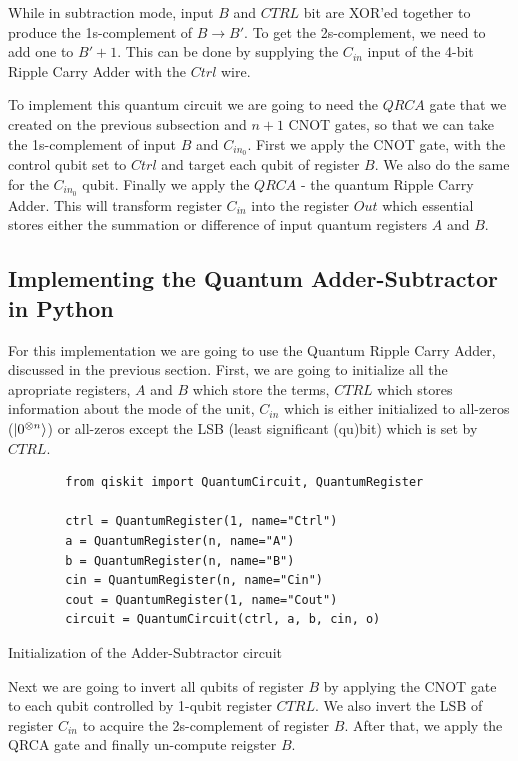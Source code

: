 While in subtraction mode, input $B$ and $CTRL$ bit are XOR'ed together to produce the 1s-complement of $B \rightarrow B'$.
To get the 2s-complement, we need to add one to $B' + 1$. This can be done by supplying the $C_{in}$ input of the
4-bit Ripple Carry Adder with the $Ctrl$ wire.

To implement this quantum circuit we are going to need the $QRCA$ gate that we created on the previous subsection and
$n+1$ CNOT gates, so that we can take the 1s-complement of input $B$ and $C_{in_{0}}$. First we apply the CNOT gate, with
the control qubit set to $Ctrl$ and target each qubit of register $B$. We also do the same for the $C_{in_{0}}$ qubit.
Finally we apply the $QRCA$ - the quantum Ripple Carry Adder. This will transform register $C_{in}$ into the register $Out$
which essential stores either the summation or difference of input quantum registers $A$ and $B$.

\subsection{Implementing the Quantum Adder-Subtractor in Python}

For this implementation we are going to use the Quantum Ripple Carry Adder, discussed in the previous section.
First, we are going to initialize all the apropriate registers, $A$ and $B$ which store the terms, $CTRL$ which
stores information about the mode of the unit, $C_{in}$ which is either initialized to all-zeros ($\ket{0^{\otimes n}}$)
or all-zeros except the LSB (least significant (qu)bit) which is set by $CTRL$.

\begin{listing}[!ht]
    \centering
    \begin{verbatim}
        from qiskit import QuantumCircuit, QuantumRegister

        ctrl = QuantumRegister(1, name="Ctrl")
        a = QuantumRegister(n, name="A")
        b = QuantumRegister(n, name="B")
        cin = QuantumRegister(n, name="Cin")
        cout = QuantumRegister(1, name="Cout")
        circuit = QuantumCircuit(ctrl, a, b, cin, o)
    \end{verbatim}
    \caption{Initialization of the Adder-Subtractor circuit}
\end{listing}

Next we are going to invert all qubits of register $B$ by applying the CNOT gate to each qubit controlled by 1-qubit
register $CTRL$. We also invert the LSB of register $C_{in}$ to acquire the 2s-complement of register $B$. After that,
we apply the QRCA gate and finally un-compute reigster $B$.

